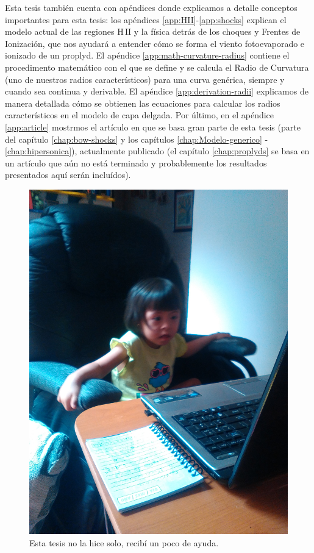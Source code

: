 \documentclass[11pt, twoside]{book}
\newcommand\Ion[2]{\ensuremath{\mathrm{#1\,\scriptstyle #2}}} %
\begin{document}
Esta tesis también cuenta con apéndices donde explicamos a detalle conceptos importantes para esta tesis: los apéndices \ref{app:HII}-\ref{app:shocks} explican el modelo actual de las regiones \Ion{H}{II} y la física detrás de los choques y Frentes de Ionización, que nos ayudará a entender cómo se forma el viento fotoevaporado e ionizado de un proplyd. El apéndice \ref{app:math-curvature-radius} contiene el procedimento matemático con el que se define y se calcula el Radio de Curvatura (uno de nuestros radios característicos) para una curva genérica, siempre y cuando sea continua y derivable. El apéndice \ref{app:derivation-radii} explicamos de manera detallada cómo se obtienen las ecuaciones para calcular los radios característicos en el modelo de capa delgada. Por último, en el apéndice \ref{app:article} mostrmos el artículo en que se basa gran parte de esta tesis (parte del capítulo \ref{chap:bow-shocks} y los capítulos \ref{chap:Modelo-generico} - \ref{chap:hipersonica}), actualmente publicado (el capítulo \ref{chap:proplyds} se basa en un artículo que aún no está terminado y probablemente los resultados presentados aquí serán incluídos).

\begin{figure}
  \centering
  \includegraphics[width=0.4\linewidth]{./Figures/helping}
  \caption*{Esta tesis no la hice solo, recibí un poco de ayuda.}
\end{figure}


\newpage

  

\pagestyle{fancy}
\fancyhf{}
\fancyhead[LE]{\footnotesize \thepage \quad\leftmark}
\fancyhead[RO]{\footnotesize \rightmark \quad\thepage}









\newpage

\end{document}
